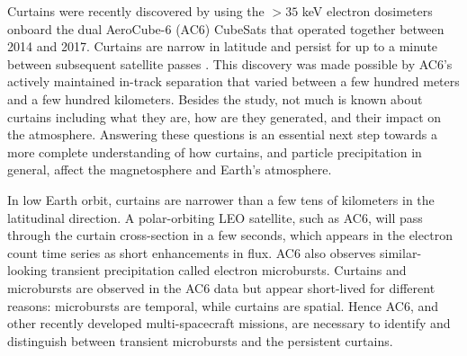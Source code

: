 \documentclass[draft]{agujournal2019}
\begin{document}
 Curtains were recently discovered by  using the $> 35$ keV electron dosimeters onboard the dual AeroCube-6 (AC6) CubeSats that operated together between 2014 and 2017. Curtains are narrow in latitude and persist for up to a minute between subsequent satellite passes . This discovery was made possible by AC6's actively maintained in-track separation that varied between a few hundred meters and a few hundred kilometers. Besides the  study, not much is known about curtains including what they are, how are they generated, and their impact on the atmosphere. Answering these questions is an essential next step towards a more complete understanding of how curtains, and particle precipitation in general, affect the magnetosphere and Earth's atmosphere.

In low Earth orbit, curtains are narrower than a few tens of kilometers in the latitudinal direction. A polar-orbiting LEO satellite, such as AC6, will pass through the curtain cross-section in a few seconds, which appears in the electron count time series as short enhancements in flux. AC6 also observes similar-looking transient precipitation called electron microbursts. Curtains and microbursts are observed in the AC6 data but appear short-lived for different reasons: microbursts are temporal, while curtains are spatial. Hence AC6, and other recently developed multi-spacecraft missions, are necessary to identify and distinguish between transient microbursts and the persistent curtains.
\end{document}
